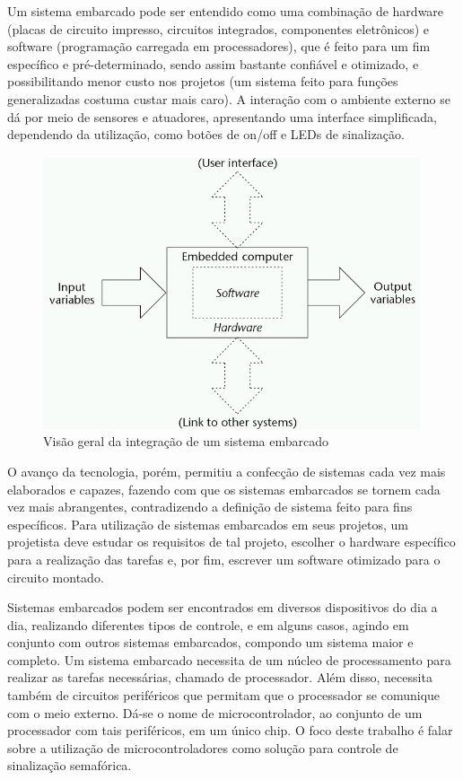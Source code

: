 Um sistema embarcado pode ser entendido como uma combinação de hardware (placas de circuito impresso, circuitos integrados, componentes eletrônicos) e software (programação carregada em processadores), que é feito para um fim específico e pré-determinado, sendo assim bastante confiável e otimizado, e possibilitando menor custo nos projetos (um sistema feito para funções generalizadas costuma custar mais caro). A interação com o ambiente externo se dá por meio de sensores e atuadores, apresentando uma interface simplificada, dependendo da utilização, como botões de on/off e LEDs de sinalização. 

\begin{figure}[ht]
    \begin{center}
    \includegraphics{figuras/embedded.PNG}
    \end{center}
    \caption[]{Visão geral da integração de um sistema embarcado}
    \label{embarcado}
\end{figure}

O avanço da tecnologia, porém, permitiu a confecção de sistemas cada vez mais elaborados e capazes, fazendo com que os sistemas embarcados se tornem cada vez mais abrangentes, contradizendo a definição de sistema feito para fins específicos. Para utilização de sistemas embarcados em seus projetos, um projetista deve estudar os requisitos de tal projeto, escolher o hardware específico para a realização das tarefas e, por fim, escrever um software otimizado para o circuito montado. %

Sistemas embarcados podem ser encontrados em diversos dispositivos do dia a dia, realizando diferentes tipos de controle, e em alguns casos, agindo em conjunto com outros sistemas embarcados, compondo um sistema maior e completo.
Um sistema embarcado necessita de um núcleo de processamento para realizar as tarefas necessárias, chamado de processador. Além disso, necessita também de circuitos periféricos que permitam que o processador se comunique com o meio externo. Dá-se o nome de microcontrolador, ao conjunto de um processador com tais periféricos, em um único chip.      
O foco deste trabalho é falar sobre a utilização de microcontroladores como solução para controle de sinalização semafórica. 

